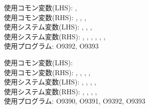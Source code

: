 \clearpage

\begin{hosoku}\small
使用コモン変数(LHS): , \\
使用コモン変数(RHS): , , , \\
使用システム変数(LHS): , , , \\
使用システム変数(RHS): , , , , , , \\
使用プログラム: O9392, O9393
\end{hosoku}


\clearpage

\begin{hosoku}\small
使用コモン変数(LHS): \\
使用コモン変数(RHS): , , , , \\
使用システム変数(LHS): , , , , \\
使用システム変数(RHS): , , , , \\
使用プログラム: O9390, O9391, O9392, O9393
\end{hosoku}


